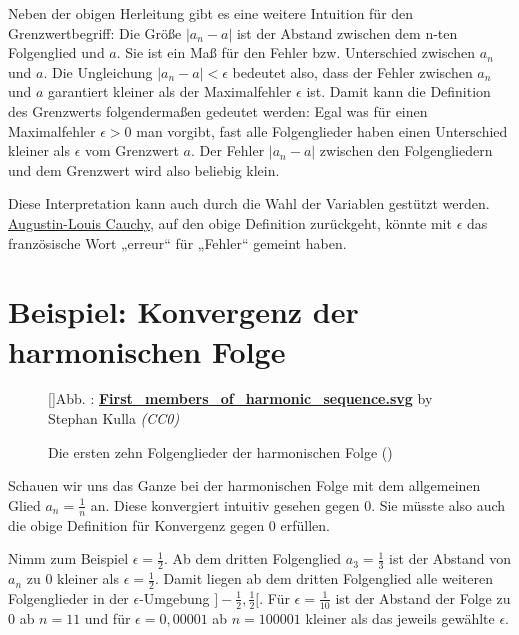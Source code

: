 \documentclass[fontsize=9pt,
               parskip=half-,
               DIV=14,
               listof=chapterentry,
               tocflat]{scrbook}
\newcounter{imagelabel}
\begin{document}
Neben der obigen Herleitung gibt es eine weitere Intuition für den Grenzwertbegriff: Die Größe $|a_{n}-a|$ ist der Abstand zwischen dem n-ten Folgenglied und $a$. Sie ist ein Maß für den Fehler bzw. Unterschied zwischen $a_{n}$ und $a$. Die Ungleichung $|a_{n}-a|<\epsilon $ bedeutet also, dass der Fehler zwischen $a_{n}$ und $a$ garantiert kleiner als der Maximalfehler $\epsilon $ ist. Damit kann die Definition des Grenzwerts folgendermaßen gedeutet werden: Egal was für einen Maximalfehler $\epsilon >0$ man vorgibt, fast alle Folgenglieder haben einen Unterschied kleiner als $\epsilon $ vom Grenzwert $a$. Der Fehler $|a_{n}-a|$ zwischen den Folgengliedern und dem Grenzwert wird also beliebig klein.

Diese Interpretation kann auch durch die Wahl der Variablen gestützt werden. \href{https://de.wikipedia.org/wiki/Augustin-Louis\%20Cauchy}
{Augustin-Louis Cauchy}, auf den obige Definition zurückgeht, könnte mit $\epsilon $ das französische Wort „erreur“ für „Fehler“ gemeint haben.

\section{Beispiel: Konvergenz der harmonischen Folge}

\begin{figure}[h]
\vspace{\baselineskip}
[]{Abb. : \protect\href{https://commons.wikimedia.org/wiki/File:First_members_of_harmonic_sequence.svg}{\textbf{First\allowbreak\_members\allowbreak\_of\allowbreak\_harmonic\allowbreak\_sequence.svg}} by Stephan Kulla \textit{(CC0)}}\centering
{}
\caption*{Die ersten zehn Folgenglieder der harmonischen Folge ()}
\end{figure}
Schauen wir uns das Ganze bei der harmonischen Folge mit dem allgemeinen Glied $a_{n}={\tfrac {1}{n}}$ an. Diese konvergiert intuitiv gesehen gegen $0$. Sie müsste also auch die obige Definition für Konvergenz gegen $0$ erfüllen.

Nimm zum Beispiel $\epsilon ={\tfrac {1}{2}}$. Ab dem dritten Folgenglied $a_{3}={\tfrac {1}{3}}$ ist der Abstand von $a_{n}$ zu $0$ kleiner als $\epsilon ={\tfrac {1}{2}}$. Damit liegen ab dem dritten Folgenglied alle weiteren Folgenglieder in der $\epsilon $-Umgebung $]-{\tfrac {1}{2}},{\tfrac {1}{2}}[$. Für $\epsilon ={\tfrac {1}{10}}$ ist der Abstand der Folge zu $0$ ab $n=11$ und für $\epsilon =0,00001$ ab $n=100001$ kleiner als das jeweils gewählte $\epsilon $.
\end{document}
